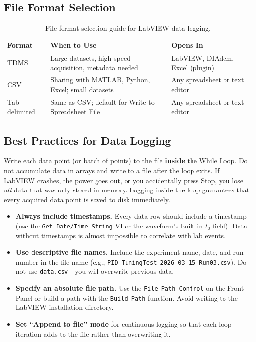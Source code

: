 \subsection{File Format Selection}

\begin{table}[htbp]\centering\small
\begin{tabularx}{\textwidth}{l X l}
\toprule
\textbf{Format} & \textbf{When to Use} & \textbf{Opens In} \\
\midrule
TDMS & Large datasets, high-speed acquisition, metadata needed & LabVIEW, DIAdem, Excel (plugin) \\
CSV & Sharing with MATLAB, Python, Excel; small datasets & Any spreadsheet or text editor \\
Tab-delimited & Same as CSV; default for Write to Spreadsheet File & Any spreadsheet or text editor \\
\bottomrule
\end{tabularx}
\caption{File format selection guide for LabVIEW data logging.}
\end{table}

\subsection{Best Practices for Data Logging}

\begin{keyconceptbox}
Write each data point (or batch of points) to the file \textbf{inside} the While Loop. Do not accumulate data in arrays and write to a file after the loop exits. If LabVIEW crashes, the power goes out, or you accidentally press Stop, you lose \emph{all} data that was only stored in memory. Logging inside the loop guarantees that every acquired data point is saved to disk immediately.
\end{keyconceptbox}

\begin{itemize}[leftmargin=1.5em]
\item \textbf{Always include timestamps.} Every data row should include a timestamp (use the \texttt{Get Date/Time String} VI or the waveform's built-in $t_0$ field). Data without timestamps is almost impossible to correlate with lab events.
\item \textbf{Use descriptive file names.} Include the experiment name, date, and run number in the file name (e.g., \texttt{PID\_TuningTest\_2026-03-15\_Run03.csv}). Do not use \texttt{data.csv}---you will overwrite previous data.
\item \textbf{Specify an absolute file path.} Use the \texttt{File Path Control} on the Front Panel or build a path with the \texttt{Build Path} function. Avoid writing to the LabVIEW installation directory.
\item \textbf{Set ``Append to file'' mode} for continuous logging so that each loop iteration adds to the file rather than overwriting it.
\end{itemize}

